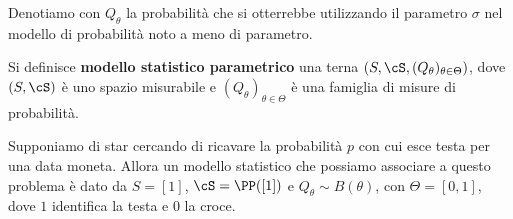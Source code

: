 \begin{multicols*}{2}
\begin{notation}
    Denotiamo con $Q_\theta$ la probabilità che si otterrebbe utilizzando il parametro $\sigma$
    nel modello di probabilità noto a meno di parametro.
\end{notation}

\begin{definition}
    Si definisce \textbf{modello statistico parametrico} una terna $(S, \cS, (Q_\theta)_{\theta \in \Theta})$,
    dove $(S, \cS)$ è uno spazio misurabile e $(Q_\theta)_{\theta \in \Theta}$ è una famiglia di
    misure di probabilità.
\end{definition}

\begin{example}
    Supponiamo di star cercando di ricavare la probabilità $p$ con cui esce testa per una data moneta. Allora
    un modello statistico che possiamo associare a questo problema è dato da $S = [1]$, $\cS = \PP([1])$ e
    $Q_\theta \sim B(\theta)$, con $\Theta = [0, 1]$, dove $1$ identifica la testa e $0$ la croce.
\end{example}

\end{multicols*}
